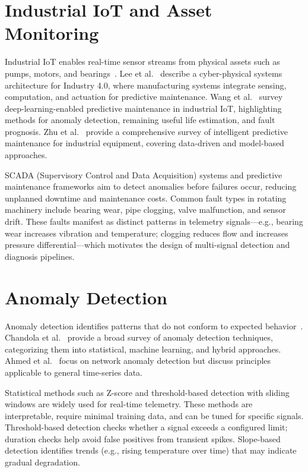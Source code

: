 \documentclass[12pt,letterpaper]{report}
\begin{document}
\section{Industrial IoT and Asset Monitoring}

Industrial IoT enables real-time sensor streams from physical assets such as pumps, motors, and bearings~\cite{lee2015cps,rahman2022deep,li2021intelligent}. Lee et al.~\cite{lee2015cps} describe a cyber-physical systems architecture for Industry 4.0, where manufacturing systems integrate sensing, computation, and actuation for predictive maintenance. Wang et al.~\cite{rahman2022deep} survey deep-learning-enabled predictive maintenance in industrial IoT, highlighting methods for anomaly detection, remaining useful life estimation, and fault prognosis. Zhu et al.~\cite{li2021intelligent} provide a comprehensive survey of intelligent predictive maintenance for industrial equipment, covering data-driven and model-based approaches.

SCADA (Supervisory Control and Data Acquisition) systems and predictive maintenance frameworks aim to detect anomalies before failures occur, reducing unplanned downtime and maintenance costs. Common fault types in rotating machinery include bearing wear, pipe clogging, valve malfunction, and sensor drift. These faults manifest as distinct patterns in telemetry signals---e.g., bearing wear increases vibration and temperature; clogging reduces flow and increases pressure differential---which motivates the design of multi-signal detection and diagnosis pipelines.

\section{Anomaly Detection}

Anomaly detection identifies patterns that do not conform to expected behavior~\cite{chandola2009anomaly,ahmed2016survey}. Chandola et al.~\cite{chandola2009anomaly} provide a broad survey of anomaly detection techniques, categorizing them into statistical, machine learning, and hybrid approaches. Ahmed et al.~\cite{ahmed2016survey} focus on network anomaly detection but discuss principles applicable to general time-series data.

Statistical methods such as Z-score and threshold-based detection with sliding windows are widely used for real-time telemetry. These methods are interpretable, require minimal training data, and can be tuned for specific signals. Threshold-based detection checks whether a signal exceeds a configured limit; duration checks help avoid false positives from transient spikes. Slope-based detection identifies trends (e.g., rising temperature over time) that may indicate gradual degradation.
\end{document}
